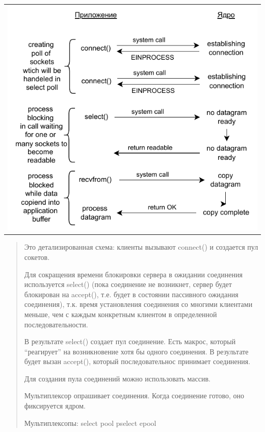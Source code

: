 \begin{table}[H]
  \centering
  \begin{tabular}{p{1\linewidth}}
    \centering
    \includegraphics[width=0.8\linewidth]{./images/5.pdf}
  \end{tabular}
\end{table}

\begin{quote}
Это детализированная схема: клиенты вызывают connect() и создается пул сокетов.

Для сокращения времени блокировки сервера в ожидании соединения используется select() (пока соединение не возникнет, сервер будет блокирован на accept(), т.е. будет в состоянии пассивного ожидания соединения), т.к. время установления соединения со многими клиентами меньше, чем с каждым конкретным клиентом в определенной последовательности.

В результате select() создает пул соединение. Есть макрос, который “реагирует” на возникновение хотя бы одного соединения. В результате будет вызан accept(), который последовательнос принимает соединения.

Для создания пула соединений можно использовать массив.

Мультиплексор опрашивает соединения. Когда соединение готово, оно фиксируется ядром.

Мультиплексопы: 
select    pool
pselect   epool
\end{quote}

